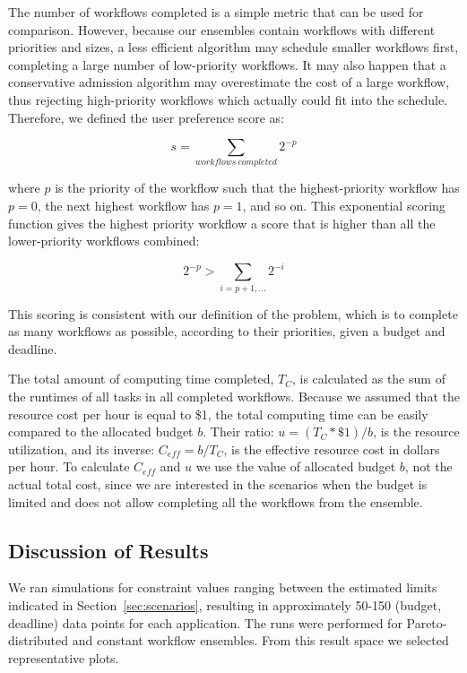 \documentclass{sig-alternate}
\begin{document}
The number of workflows completed is a simple metric that can be used for
comparison. However, because our ensembles contain workflows with different 
priorities and sizes, a less efficient algorithm may schedule smaller
workflows first, completing a large number of low-priority workflows. It may 
also happen that a conservative admission algorithm may overestimate the cost 
of a large workflow, thus rejecting high-priority workflows which actually 
could fit into the schedule. Therefore, we defined the user preference score as:

\begin{equation}
\label{eq:score}
s = \sum_{workflows\ completed}{2^{-p}}
\end{equation}

where $p$ is the priority of the workflow such that the highest-priority workflow 
has $p=0$, the next highest workflow has $p=1$, and so on. This exponential scoring 
function gives the highest priority workflow a score that is higher than all the 
lower-priority workflows combined:

\begin{equation}
\label{eq:score-property}
2^{-p} > \sum_{i=p+1,\ldots}2^{-i}
\end{equation}

This scoring is consistent with our definition of the problem, which is to 
complete as many workflows as possible, according to their priorities, given 
a budget and deadline.

The total amount of computing time completed, $T_C$, is calculated as the sum 
of the runtimes of all tasks in all completed workflows. Because we assumed 
that the resource cost per hour is equal to \$1, the total computing time 
can be easily compared to the allocated budget $b$. Their ratio: 
$u = (T_C * \$1)/b$, is the resource utilization, and its inverse: 
$C_{eff} = b/T_C$, is the effective resource cost in dollars per hour. To
calculate $C_{eff}$ and $u$ we use the value of allocated budget $b$, not the
actual total cost, since we are interested in the scenarios when the budget is
limited and does not allow completing all the workflows from the ensemble.



\subsection{Discussion of Results}

We ran simulations for constraint values ranging between the estimated 
limits indicated in Section~\ref{sec:scenarios}, resulting in approximately 
50-150 (budget, deadline) data points for each application. The runs were
performed for Pareto-distributed and constant workflow ensembles. From this result
space we selected representative plots. 
\end{document}
